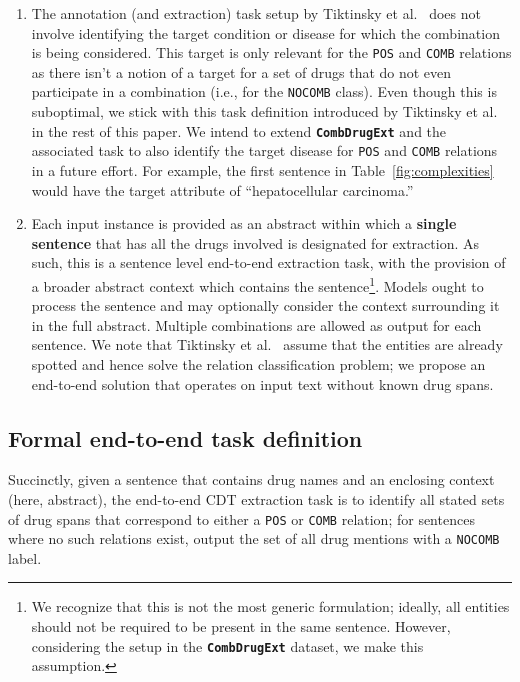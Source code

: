 \documentclass[conference]{IEEEtran}
\begin{document}
\begin{enumerate}
\item The annotation (and extraction) task setup by  Tiktinsky et al.~\cite{tiktinsky-etal-2022-dataset}  does not involve identifying the target condition or disease for which the combination is being considered. 
This target is only relevant for the \texttt{POS} and \texttt{COMB} relations as there isn't a notion of a target for a set of drugs that do not even participate in a combination (i.e., for the \texttt{NOCOMB} class). 
Even though this is suboptimal, we stick with this task definition introduced by Tiktinsky et al.~\cite{tiktinsky-etal-2022-dataset} in the rest of this paper. We intend to extend \textbf{\texttt{CombDrugExt}} and the associated task to also identify the target disease for \texttt{POS} and \texttt{COMB} relations in a future effort. For example, the first sentence in Table~\ref{fig:complexities} would have the target attribute of ``hepatocellular carcinoma.''
\item Each input instance is provided as an abstract within which a \textbf{single sentence} that has all the drugs involved is designated for extraction. As such, this is a sentence level end-to-end extraction task, with the provision of a broader abstract context which contains the sentence\footnote{We recognize that this is not   the most generic formulation; ideally, all entities should not be required to be present in the same sentence. However, considering the setup in the \textbf{\texttt{CombDrugExt}} dataset, we make this assumption.}. Models ought to process the sentence and may optionally consider the context surrounding it in the full abstract. Multiple combinations are allowed as output for each sentence.
We note that Tiktinsky et al.~\cite{tiktinsky-etal-2022-dataset} assume that the entities are already spotted and hence solve the relation classification problem; we propose an end-to-end solution that operates on input text without known drug spans.
\end{enumerate} 




\subsection{Formal end-to-end task definition}
\label{sec-formal}
Succinctly, given a sentence that contains drug names and an enclosing context (here, abstract), the end-to-end CDT extraction task is to identify all stated sets of drug  spans that correspond to either a \texttt{POS} or \texttt{COMB} relation; for sentences where no such relations exist, output the set of all drug mentions with a \texttt{NOCOMB} label.   
\end{document}
